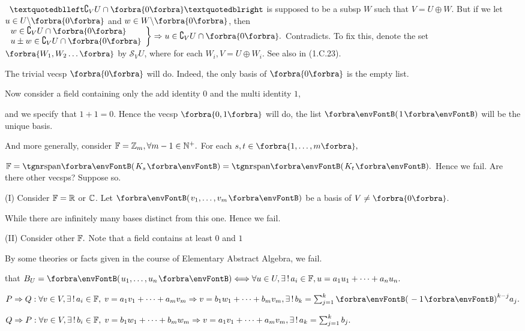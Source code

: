 \documentclass[a4paper, 11pt, UTF8]{article}
\begin{document}
\begin{large}
\BulletPoint \,\hspace{1pt}\TextB{}
$“\complement_V U \cap \zeroSubs”$ is supposed to be a subsp $W$ such that $V=U\oplus W$.\TextB{}
But if we let $u\in U\backslash\zeroSubs$ and $w\in W\backslash\zeroSubs$, then $\MathRightBrace{l}{w\in\complement_V U \cap \zeroSubs\\ u\pm w\in\complement_V U \cap \zeroSubs }\Rightarrow u\in\complement_V U \cap \zeroSubs.$ Contradicts.\vspace{4pt}\TextB{}
To fix this, {\Large\envFontLarge denote the set $\Bra{W_1,W_2\dots}$ by $\mathcal{S}_V U$,} {\small where for each $W_i,V=U\oplus W_i$. See also in (1.C.23).}\par\SepLine

The trivial vecsp $\zeroSubs$ will do. Indeed, the only basis of $\zeroSubs$ is the empty list.\par\quad
Now consider a field containing only the add identity $0$ and the multi identity $1$,\par\quad
and we specify that $1+1=0.$ Hence the vecsp $\Bra{0,1}$ will do, the list $\Par{1}$ will be the unique basis.\par\quad
And more generally, consider ${\mathbb{F}}={\mathbb{Z}}_m,\forall m-1\in{\mathbb{N}^+}.$ For each $s,t\in\Bra{1,\dots,m},$\par\quad
$\Fbb=\Span{K_s}=\Span{K_t}.$ Hence we fail.
Are there other vecsps? Suppose so.\par\quad
(I) Consider ${\mathbb{F}}={\mathbb{R}}$ or ${\mathbb{C}}$. Let $\Par{v_1,\dots,v_m}$ be a basis of $V\neq\zeroSubs$.\par\quad\HI
While there are infinitely many bases distinct from this one. Hence we fail.\par\quad\EndI
(II) Consider other ${\mathbb{F}}.$ Note that a field contains at least $0$ and $1$\par\quad\HII
By {\tgsc some theories or facts} given in the course of Elementary Abstract Algebra, we fail.\PfEnd
\SepLine

\NOTICE that $B_U=\Par{u_1,\dots,u_n}\Longleftrightarrow\forall u\in U,\exists\,!\,a_i\in\Fbb,u=a_1 u_1+\dots+a_n u_n.$\par\quad
$P\Rightarrow Q:\forall v\in V,\exists\,!\,a_i\in\Fbb,\;v=a_1 v_1+\dots+a_m v_m\Rightarrow v=b_1 w_1+\dots+b_m v_m,\exists\,!\,b_k=\sum_{j=1}^k\Par{-1}^{k-j}a_j.$\par\quad
$Q\Rightarrow P:\forall v\in V,\exists\,!\,b_i\in{\mathbb{F}},\;v=b_1w_1+\dots+b_mw_m\Rightarrow v=a_1v_1+\dots+a_mv_m,\exists\,!\,a_k=\sum_{j=1}^k b_j.$\PfEnd
\SepLine


\end{large}
\end{document}
